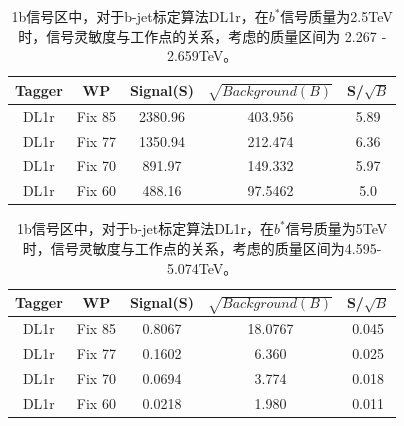 \begin{table}[ht]
        \begin{center}
                \begin{tabular}{|c|c|c|c|c|}\hline
                        Tagger       & WP          & Signal(S)    & $\sqrt{Background(B)}$    & S/$\sqrt{B}$ \\\hline
                        DL1r          & Fix 85      & 2380.96      &  403.956        & 5.89         \\
                        DL1r          & Fix 77      & 1350.94       & 212.474          & 6.36         \\
                        DL1r          & Fix 70      & 891.97     & 149.332      & 5.97       \\
                        DL1r          & Fix 60      & 488.16     &  97.5462       & 5.0     \\
                        \hline
                \end{tabular}
        \end{center}
        \caption{
        1b信号区中，对于b-jet标定算法DL1r，在$b^*$信号质量为2.5TeV时，信号灵敏度与工作点的关系，考虑的质量区间为 2.267 ­ 2.659TeV。
         }
        \label{tab:Sensbstar2p5TeV}
\end{table}%


\begin{table}[ht]
        \begin{center}
                \begin{tabular}{|c|c|c|c|c|}\hline
                        Tagger       & WP          & Signal(S)    & $\sqrt{Background(B)}$    & S/$\sqrt{B}$ \\\hline
                        DL1r          & Fix 85      & 0.8067    &   18.0767       & 0.045        \\
                        DL1r          & Fix 77      & 0.1602      &  6.360         & 0.025       \\
                        DL1r          & Fix 70      & 0.0694     & 3.774       & 0.018       \\
                        DL1r          & Fix 60      & 0.0218      & 1.980         & 0.011       \\
                        \hline
                \end{tabular}
        \end{center}
        \caption{
        1b信号区中，对于b-jet标定算法DL1r，在$b^*$信号质量为5TeV时，信号灵敏度与工作点的关系，考虑的质量区间为4.595-5.074TeV。
        }
        \label{tab:Sensbstar5TeV}
\end{table}%





















